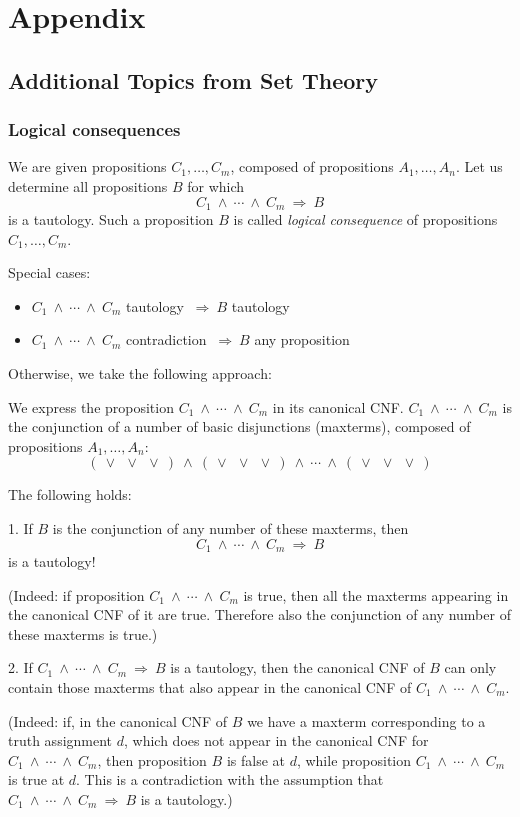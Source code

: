 \documentclass[11pt,paper=b5,footinclude,headinclude]{scrbook} %
\def\ali {{~\vee~}}
\def\inn {{~\wedge~}}
\def\sledi {{~\Rightarrow~}}
\theoremstyle{remark}
\theoremstyle{definition} %
\theoremstyle{theorem} %
\begin{document}
\appendix
\cleardoublepage\part*{Appendix}
\chapter{Additional Topics from Set Theory}
\section{Logical consequences}

We are given propositions $C_1,\ldots, C_m$, composed of propositions $A_1,\ldots, A_n$.
Let us determine all propositions $B$ for which $$C_1\inn\cdots\inn C_m\sledi B$$
is a tautology. Such a proposition $B$ is called  {\em logical consequence}
of propositions $C_1,\ldots, C_m$.

Special cases:
\begin{itemize}
  \item $C_1\inn\cdots\inn C_m$ tautology  $\sledi B$ tautology
  \item $C_1\inn\cdots\inn C_m$ contradiction $\sledi B$ any proposition
\end{itemize}

Otherwise, we take the following approach:

We express the proposition $C_1\inn\cdots\inn C_m$ in its canonical CNF.
$C_1\inn\cdots\inn C_m$ is the conjunction of a number of basic disjunctions (maxterms), composed of
propositions $A_1,\ldots, A_n$:
$$( \ali\ali\ali) \inn ( \ali\ali\ali) \inn \cdots \inn (\ali\ali\ali)$$

The following holds:

1. If $B$ is the conjunction of any number of these maxterms, then
$$C_1\inn\cdots\inn C_m\sledi B$$
is a tautology!

(Indeed: if proposition $C_1\inn\cdots\inn C_m$ is true, then all the maxterms appearing in the canonical CNF of it are true. Therefore also the conjunction of any number of these maxterms is true.)

2. If $C_1\inn\cdots\inn C_m\sledi B$ is a tautology, then the canonical CNF of $B$ can only contain those maxterms that also appear
in the canonical CNF of $C_1\inn\cdots\inn C_m$.

(Indeed: if, in the canonical CNF of $B$ we have a maxterm corresponding to a truth assignment $d$, which does not appear in the canonical CNF for
$C_1\inn\cdots\inn C_m$, then proposition $B$ is false at $d$, while proposition $C_1\inn\cdots\inn C_m$ is true at $d$. This is a contradiction with the assumption that  $C_1\inn\cdots\inn C_m\sledi B$ is a tautology.)
\end{document}
